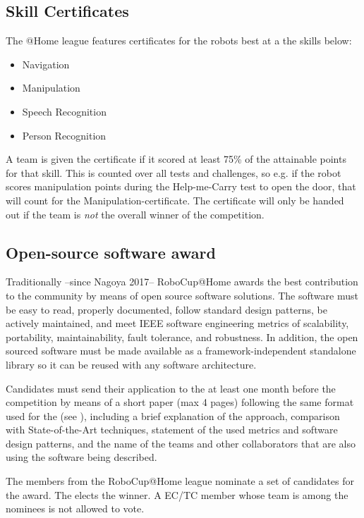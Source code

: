 \subsection{Skill Certificates}
\label{award:skill}
The @Home league features certificates for the robots best at a the skills below:
\begin{itemize}
   \item Navigation
   \item Manipulation
   \item Speech Recognition
   \item Person Recognition
  \end{itemize}

A team is given the certificate if it scored at least 75\% of the attainable points for that skill.
This is counted over all tests and challenges, so e.g. if the robot scores manipulation points during the Help-me-Carry test to open the door, that will count for the Manipulation-certificate.
The certificate will only be handed out if the team is \emph{not} the overall winner of the competition.


\subsection{Open-source software award}
\label{award:oss}
Traditionally --since Nagoya 2017-- RoboCup@Home awards the best contribution to the community by means of open source software solutions. The software must be easy to read, properly documented, follow standard design patterns, be actively maintained, and meet IEEE software engineering metrics of scalability, portability, maintainability, fault tolerance, and robustness. In addition, the open sourced software must be made available as a framework-independent standalone library so it can be reused with any software architecture.

Candidates must send their application to the  at least one month before the competition by means of a short paper (max 4 pages) following the same format used for the  (see ), including a brief explanation of the approach, comparison with State-of-the-Art techniques, statement of the used metrics and software design patterns, and the name of the teams and other collaborators that are also using the software being described.

The  members from the RoboCup@Home league nominate a set of candidates for the award. The  elects the winner. A EC/TC member whose team is among the nominees is not allowed to vote.


